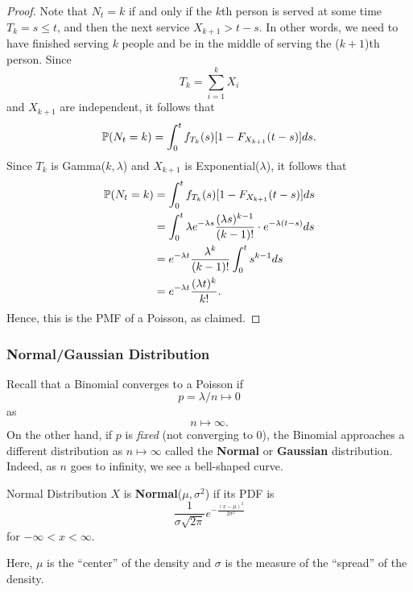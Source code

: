 \documentclass[letterpaper]{article}
\begin{document}
\begin{mdframed}[]
    \begin{proof}
        Note that $N_t = k$ if and only if the $k$th person is served at some time $T_k = s \leq t$, and then the next service $X_{k + 1} > t - s$. In other words, we need to have finished serving $k$ people and be in the middle of serving the ($k + 1$)th person. Since \[T_k = \sum_{i = 1}^{k} X_i\] and $X_{k + 1}$ are independent, it follows that 
        \[\mathbb{P}(N_t = k) = \int_{0}^t f_{T_k}(s) [1 - F_{X_{k + 1}} (t - s)] ds.\]
        Since $T_k$ is Gamma($k, \lambda$) and $X_{k + 1}$ is Exponential($\lambda$), it follows that 
        \begin{equation*}
            \begin{aligned}
                \PR(N_t = k) &= \int_{0}^t f_{T_k}(s) [1 - F_{X_{k + 1}} (t - s)] ds \\ 
                    &= \int_{0}^{t} \lambda e^{-\lambda s} \frac{(\lambda s)^{k - 1}}{(k - 1)!} \cdot e^{-\lambda (t - s)} ds \\ 
                    &= e^{-\lambda t} \frac{\lambda^k}{(k - 1)!} \int_{0}^{t} s^{k - 1} ds \\ %
                    &= e^{-\lambda t} \frac{(\lambda t)^k}{k!}.
            \end{aligned}
        \end{equation*}
        Hence, this is the PMF of a Poisson, as claimed. 
    \end{proof}
\end{mdframed}

\subsubsection{Normal/Gaussian Distribution}
Recall that a Binomial converges to a Poisson if 
\[p = \lambda / n \mapsto 0\]
as \[n \mapsto \infty.\]
On the other hand, if $p$ is \emph{fixed} (not converging to 0), the Binomial approaches a different distribution as $n \mapsto \infty$ called the \textbf{Normal} or \textbf{Gaussian} distribution. Indeed, as $n$ goes to infinity, we see a bell-shaped curve. 
\begin{definition}{Normal Distribution}{}
    $X$ is \textbf{Normal}($\mu, \sigma^2$) if its PDF is 
    \[\frac{1}{\sigma \sqrt{2\pi}} e^{-\frac{(x - \mu)^2}{2 \sigma^2}}\]
    for $-\infty < x < \infty$. 
\end{definition}
Here, $\mu$ is the ``center'' of the density and $\sigma$ is the measure of the ``spread'' of the density. 
\end{document}
